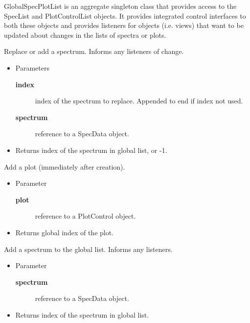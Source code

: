 {GlobalSpecPlotList is an aggregate singleton class that provides access
 to the SpecList and PlotControlList objects. It provides integrated
 control interfaces to both these objects and provides listeners for
 objects (i.e. views) that want to be updated about changes in the
 lists of spectra or plots.}
\methods
{}
\begin{desc}Replace or add a spectrum. Informs any listeners of change.
\begin{itemize}
\item{Parameters
  \begin{description}
   \item[\textbf{index}]{index of the spectrum to replace. Appended to end
               if index not used.}
   \item[\textbf{spectrum}]{reference to a SpecData object.}
  \end{description}}
\end{itemize}
\begin{itemize}
\item{Returns index of the spectrum in global list, or -1. }
\end{itemize}
\end{desc}

\begin{desc}Add a plot (immediately after creation).
\begin{itemize}
\item{Parameter
  \begin{description}
   \item[\textbf{plot}]{reference to a PlotControl object.}
  \end{description}}
\end{itemize}
\begin{itemize}
\item{Returns global index of the plot. }
\end{itemize}
\end{desc}

\begin{desc}Add a spectrum to the global list. Informs any listeners.
\begin{itemize}
\item{Parameter
  \begin{description}
   \item[\textbf{spectrum}]{reference to a SpecData object.}
  \end{description}}
\end{itemize}
\begin{itemize}
\item{Returns index of the spectrum in global list. }
\end{itemize}
\end{desc}

